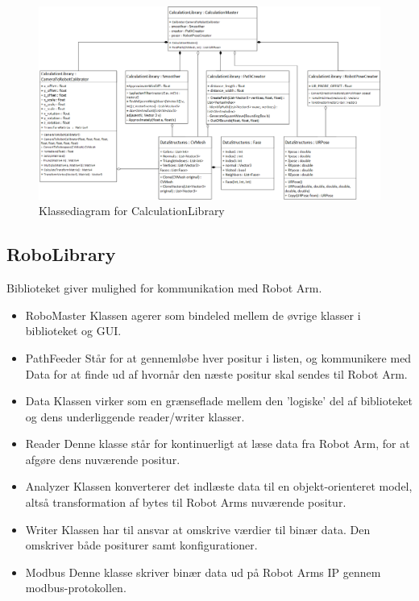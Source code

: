 \begin{figure}[H]
    \centering
    \includegraphics[width=1\textwidth]{figurer/d/Design/Class/uml_class_calculationlibrary}
    \caption{Klassediagram for CalculationLibrary}
    \label{class_ConversionLib}
\end{figure}
\newpage

\subsection{RoboLibrary}
Biblioteket giver mulighed for kommunikation med Robot Arm.

\begin{itemize}
\item{RoboMaster}\newline
Klassen agerer som bindeled mellem de øvrige klasser i biblioteket og GUI.

\item{PathFeeder} \newline
Står for at gennemløbe hver positur i listen, og kommunikere med Data for at finde ud af hvornår den næste positur skal sendes til Robot Arm.

\item{Data}\newline
Klassen virker som en grænseflade mellem den 'logiske' del af biblioteket og dens underliggende reader/writer klasser.

\item{Reader}\newline
Denne klasse står for kontinuerligt at læse data fra Robot Arm, for at afgøre dens nuværende positur. 

\item{Analyzer} \newline
Klassen konverterer det indlæste data til en objekt-orienteret model, altså transformation af bytes til Robot Arms nuværende positur.

\item{Writer}\newline
Klassen har til ansvar at omskrive værdier til binær data. Den omskriver både positurer samt konfigurationer.

\item{Modbus}\newline
Denne klasse skriver binær data ud på Robot Arms IP gennem modbus-protokollen.
\end{itemize}

